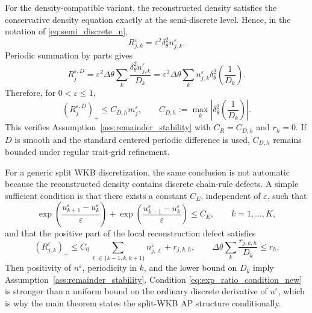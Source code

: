 \documentclass[11pt]{article}
\begin{document}
For the density-compatible variant, the reconstructed density satisfies the conservative density equation exactly at the semi-discrete level.  Hence, in the notation of \eqref{eq:semi_discrete_n},
\[
    R_{j,k}^{\varepsilon}=\varepsilon^2\delta_\theta^2 n_{j,k}^{\varepsilon}.
\]
Periodic summation by parts gives
\begin{equation}\label{eq:dc_remainder_sbp_new}
    R_j^{\varepsilon,D}
    =\varepsilon^2\Delta\theta\sum_k
    \frac{\delta_\theta^2 n_{j,k}^{\varepsilon}}{D_k}
    =\varepsilon^2\Delta\theta\sum_k
    n_{j,k}^{\varepsilon}\delta_\theta^2\left(\frac{1}{D_k}\right).
\end{equation}
Therefore, for \(0<\varepsilon\le1\),
\begin{equation}\label{eq:dc_remainder_bound_new}
    (R_j^{\varepsilon,D})_+
    \le
    C_{D,h}m_j^\varepsilon,
    \qquad
    C_{D,h}:=\max_k\left|\delta_\theta^2\left(\frac{1}{D_k}\right)\right|.
\end{equation}
This verifies Assumption~\ref{ass:remainder_stability} with \(C_R=C_{D,h}\) and \(r_h=0\).  If \(D\) is smooth and the standard centered periodic difference is used, \(C_{D,h}\) remains bounded under regular trait-grid refinement.

For a generic split WKB discretization, the same conclusion is not automatic because the reconstructed density contains discrete chain-rule defects.  A simple sufficient condition is that there exists a constant \(C_E\), independent of \(\varepsilon\), such that
\begin{equation}\label{eq:exp_ratio_condition_new}
    \exp\left(\frac{u_{k+1}^{\varepsilon}-u_k^{\varepsilon}}{\varepsilon}\right)
    +
    \exp\left(\frac{u_{k-1}^{\varepsilon}-u_k^{\varepsilon}}{\varepsilon}\right)
    \le C_E,
    \qquad k=1,\ldots,K,
\end{equation}
and that the positive part of the local reconstruction defect satisfies
\begin{equation}\label{eq:local_defect_condition_new}
    (R_{j,k}^{\varepsilon})_+
    \le C_0\sum_{\ell\in\{k-1,k,k+1\}}n_{j,\ell}^{\varepsilon}+r_{j,k,h},
    \qquad
    \Delta\theta\sum_k\frac{r_{j,k,h}}{D_k}\le r_h.
\end{equation}
Then positivity of \(n^\varepsilon\), periodicity in \(k\), and the lower bound on \(D_k\) imply Assumption~\ref{ass:remainder_stability}.  Condition \eqref{eq:exp_ratio_condition_new} is stronger than a uniform bound on the ordinary discrete derivative of \(u^\varepsilon\), which is why the main theorem states the split-WKB AP structure conditionally.
\end{document}

